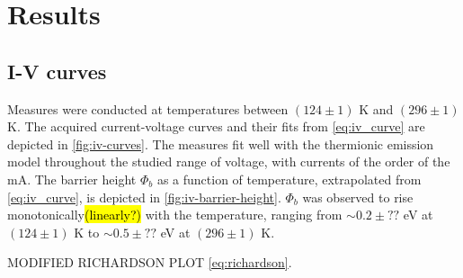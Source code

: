 \section{Results}
\subsection{I-V curves} \label{sec:results_iv}
Measures were conducted at temperatures between $(124 \pm 1)$ K and $(296\pm1)$ K. 
The acquired current-voltage curves and their fits from \autoref{eq:iv_curve} are depicted in \autoref{fig:iv-curves}.
The measures fit well with the thermionic emission model throughout the studied range of voltage, with currents of the order of the mA.
The barrier height $\Phi_b$ as a function of temperature, extrapolated from \autoref{eq:iv_curve}, is depicted in \autoref{fig:iv-barrier-height}.
$\Phi_b$ was observed to rise monotonically\hl{(linearly?)} with the temperature, ranging from $\sim 0.2 \pm ??$ eV at $(124 \pm 1)$ K to $\sim 0.5 \pm ??$ eV at $(296 \pm 1)$ K.

MODIFIED RICHARDSON PLOT \autoref{eq:richardson}.

